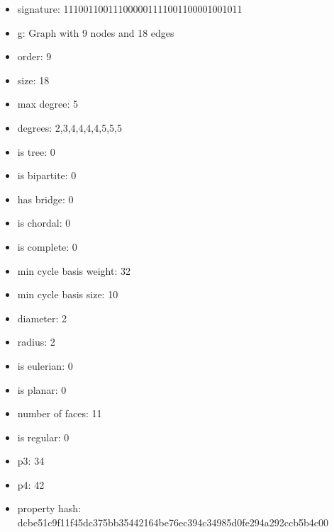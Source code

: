 \newpage
\begin{figure}
\end{figure}
\begin{itemize}
\item signature: 111001100111000001111001100001001011
\item g: Graph with 9 nodes and 18 edges
\item order: 9
\item size: 18
\item max degree: 5
\item degrees: 2,3,4,4,4,4,5,5,5
\item is tree: 0
\item is bipartite: 0
\item has bridge: 0
\item is chordal: 0
\item is complete: 0
\item min cycle basis weight: 32
\item min cycle basis size: 10
\item diameter: 2
\item radius: 2
\item is eulerian: 0
\item is planar: 0
\item number of faces: 11
\item is regular: 0
\item p3: 34
\item p4: 42
\item property hash: dcbe51c9f11f45dc375bb35442164be76ec394c34985d0fe294a292ccb5b4c00
\end{itemize}
